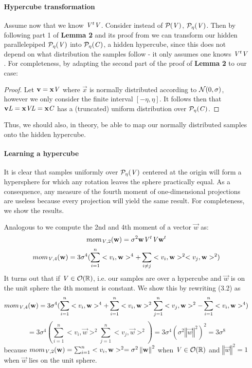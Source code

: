 \paragraph{Hypercube transformation}
Assume now that we know $\mat{V}^t \mat{V}$. Consider instead of $\PP{V}$, $\PP[\eta]{V}$.
Then by following part 1 of \textbf{Lemma 2} and its proof from \cite{NR09} we can transform our hidden parallelepiped $\PP[\eta]{V}$ into $\PP[\eta]{C}$, a hidden hypercube,
since this does not depend on what distribution the samples follow - it only assumes one knows $\mat{V}^t\mat{V}$.
For completeness, by adapting the second part of the proof of \textbf{Lemma 2} to our case: 
\begin{proof}
    Let $\vec{v} = \vec{x}\mat{V}$ where $\vec{x}$ is normally distributed according to $\normdist{0}{\sigma}$, however we only consider the finite interval $[-\eta,\eta]$.
    It follows then that $\vec{v}\mat{L} = \vec{x}\mat{V}\mat{L} = \vec{x}\mat{C}$ has a (truncated) uniform distribution over $\PP[\eta]{C}$.
\end{proof}
Thus, we should also, in theory, be able to map our normally distributed samples onto the hidden hypercube.

\paragraph{Learning a hypercube}
It is clear that samples uniformly over $\PP[\eta]{V}$ centered at the origin will form a hypersphere for which any rotation leaves the sphere practically equal. As a consequence, any measure of the fourth moment of one-dimensional projections are 
useless because every projection will yield the same result.
For completeness, we show the results.

Analogous to \cite{NR09} we compute the 2nd and 4th moment of a vector $\vec{w}$ as: \\
\begin{equation}
mom_{\mat{V}, 2}(\vec{w}) = \sigma^2 \vec{w}\mat{V}^t\mat{V}\vec{w}^t \\
\end{equation}
\begin{equation}
mom_{\mat{V}, 4}(\vec{w}) = 3 \sigma^4 (\sum_{i=1}^{n} <v_i, \vec{w}>^4 + \sum_{i \neq j} <v_i, \vec{w}>^2 <v_j, \vec{w}>^2)
\end{equation}
It turns out that if $\mat{V} \in \mathcal{O}(\bb{R})$, i.e. our samples are over a hypercube and $\vec{w}$ is on the unit sphere the 4th moment is constant. We show this by rewriting (3.2) as  
\[ mom_{\mat{V}, 4}(\vec{w}) = 3\sigma^4(\sum_{i=1}^n<v_i, \vec{w}>^4 + \sum_{i=1}^n <v_i, \vec{w}>^2 \sum_{j=1}^n <v_j, \vec{w}>^2 - \sum_{i=1}^n<v_i, \vec{w}>^4 )\]
\[ = 3\sigma^4(\sum_{i=1}^n <v_i, \vec{w}>^2 \sum_{j=1}^n <v_j, \vec{w}>^2) = 3\sigma^4(\sigma^2\left \Vert \vec{w} \right \Vert^2)^2 = 3\sigma^8\]
because $mom_{\mat{V}, 2}(\vec{w}) = \sum_{i=1}^n <v_i, \vec{w}>^2 = \sigma^2 \left \Vert \vec{w} \right \Vert^2$ when $\mat{V} \in \mathcal{O}(\bb{R})$ and $\left \Vert \vec{w} \right \Vert^2 = 1$ when $\vec{w}$ lies on the unit sphere.

